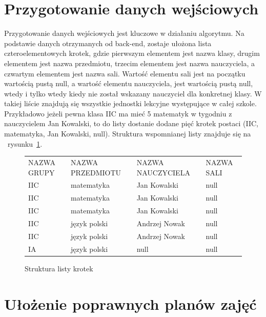 \section{Przygotowanie danych wejściowych}
    
    Przygotowanie danych wejściowych jest kluczowe w działaniu algorytmu. Na podstawie danych otrzymanych od back-end, zostaje ułożona lista czteroelementowych krotek, gdzie pierwszym elementem jest nazwa klasy, drugim elementem jest nazwa przedmiotu, trzecim elementem jest nazwa nauczyciela, a czwartym elementem jest nazwa sali. Wartość elementu sali jest na początku wartością pustą null, a wartość elementu nauczyciela, jest wartością pustą null, wtedy i tylko wtedy kiedy nie został wskazany nauczyciel dla konkretnej klasy. W takiej liście znajdują się wszystkie jednostki lekcyjne występujące w całej szkole. Przykładowo jeżeli pewna klasa IIC ma mieć 5 matematyk w tygodniu z nauczycielem Jan Kowalski, to do listy dostanie dodane pięć krotek postaci (IIC, matematyka, Jan Kowalski, null). Struktura wspomnianej listy znajduje się na ~rysunku~\ref{rys:krotki}.


\begin{figure}[]
\begin{tabular}{llll}
NAZWA GRUPY & NAZWA PRZEDMIOTU & NAZWA NAUCZYCIELA & NAZWA SALI \\
IIC         & matematyka       & Jan Kowalski      & null       \\
IIC         & matematyka       & Jan Kowalski      & null       \\
IIC         & matematyka       & Jan Kowalski      & null       \\
IIC         & język polski     & Andrzej Nowak     & null       \\
IIC         & język polski     & Andrzej Nowak     & null       \\
IA          & język polski     & null              & null      
\end{tabular}
\caption{Struktura listy krotek} \label{rys:krotki}
\end{figure}

\section{Ułożenie poprawnych planów zajęć}

